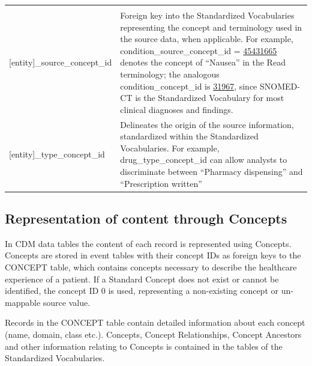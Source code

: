\documentclass[11pt]{book}
\theoremstyle{definition}
\theoremstyle{definition}
\theoremstyle{definition}
\theoremstyle{remark}
\begin{document}
\begin{longtable}[]{@{}ll@{}}
\begin{minipage}[t]{0.61\columnwidth}
\end{minipage}\tabularnewline
\begin{minipage}[t]{0.34\columnwidth}\raggedright
{[}entity{]}\_source\_concept\_id\strut
\end{minipage} & \begin{minipage}[t]{0.61\columnwidth}\raggedright
Foreign key into the Standardized Vocabularies representing the concept and terminology used in the source data, when applicable. For example, condition\_source\_concept\_id = \href{http://athena.ohdsi.org/search-terms/terms/45431665}{45431665} denotes the concept of ``Nausea'' in the Read terminology; the analogous condition\_concept\_id is \href{http://athena.ohdsi.org/search-terms/terms/31967}{31967}, since SNOMED-CT is the Standardized Vocabulary for most clinical diagnoses and findings.\strut
\end{minipage}\tabularnewline
\begin{minipage}[t]{0.34\columnwidth}\raggedright
{[}entity{]}\_type\_concept\_id\strut
\end{minipage} & \begin{minipage}[t]{0.61\columnwidth}\raggedright
Delineates the origin of the source information, standardized within the Standardized Vocabularies. For example, drug\_type\_concept\_id can allow analysts to discriminate between ``Pharmacy dispensing'' and ``Prescription written''\strut
\end{minipage}\tabularnewline
\bottomrule
\end{longtable}

\hypertarget{representation-of-content-through-concepts}{%
\subsection{Representation of content through Concepts}\label{representation-of-content-through-concepts}}

In CDM data tables the content of each record is represented using Concepts. Concepts are stored in event tables with their concept IDs as foreign keys to the CONCEPT table, which contains concepts necessary to describe the healthcare experience of a patient. If a Standard Concept does not exist or cannot be identified, the concept ID 0 is used, representing a non-existing concept or un-mappable source value.

Records in the CONCEPT table contain detailed information about each concept (name, domain, class etc.). Concepts, Concept Relationships, Concept Ancestors and other information relating to Concepts is contained in the tables of the Standardized Vocabularies.
\end{document}
